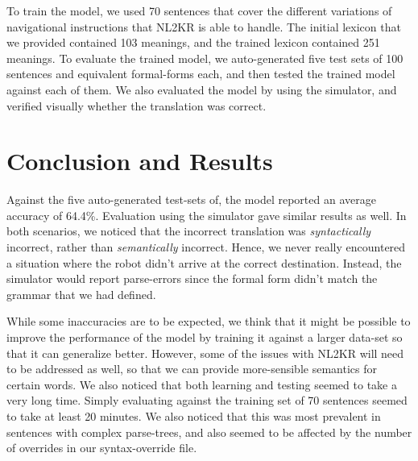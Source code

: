 \documentclass[11pt,letterpaper]{article}
\begin{document}
To train the model, we used 70 sentences that cover the different variations of navigational instructions that NL2KR is able to handle. The initial  lexicon that we provided contained 103 meanings, and the trained lexicon contained 251 meanings. To evaluate the trained model, we auto-generated five test sets of 100 sentences and equivalent formal-forms each, and then tested the trained model against each of them. We also evaluated the model by using the simulator, and verified visually whether the translation was correct.

\section{Conclusion and Results}

Against the five auto-generated test-sets of, the model reported an average accuracy of 64.4\%. Evaluation using the simulator gave similar results as well. In both scenarios, we noticed that the incorrect translation was \textit{syntactically} incorrect, rather than \textit{semantically} incorrect. Hence, we never really encountered a situation where the robot didn't arrive at the correct destination. Instead, the simulator would report parse-errors since the formal form didn't match the grammar that we had defined.

While some inaccuracies are to be expected, we think that it might be possible to improve the performance of the model by training it against a larger data-set so that it can generalize better. However, some of the issues with NL2KR will need to be addressed as well, so that we can provide more-sensible semantics for certain words. We also noticed that both learning and testing seemed to take a very long time. Simply evaluating against the training set of 70 sentences seemed to take at least 20 minutes. We also noticed that this was most prevalent in sentences with complex parse-trees, and also seemed to be affected by the number of overrides in our syntax-override file.
\end{document}
